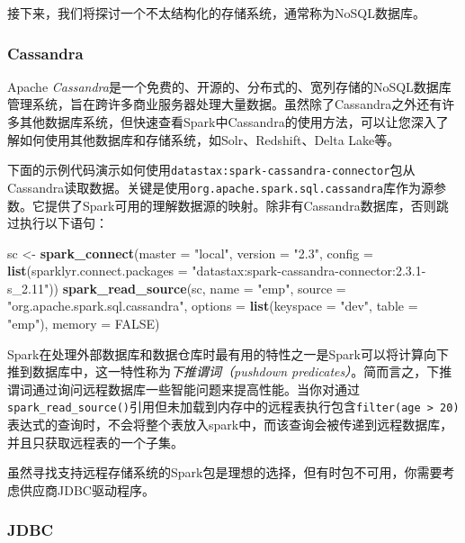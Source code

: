 \documentclass[
]{article}
\newenvironment{Shaded}{\begin{snugshade}}{\end{snugshade}}
\newcommand{\DataTypeTok}[1]{\textcolor[rgb]{0.13,0.29,0.53}{#1}}
\newcommand{\KeywordTok}[1]{\textcolor[rgb]{0.13,0.29,0.53}{\textbf{#1}}}
\newcommand{\NormalTok}[1]{#1}
\newcommand{\OtherTok}[1]{\textcolor[rgb]{0.56,0.35,0.01}{#1}}
\newcommand{\StringTok}[1]{\textcolor[rgb]{0.31,0.60,0.02}{#1}}
\begin{document}
接下来，我们将探讨一个不太结构化的存储系统，通常称为NoSQL数据库。

\hypertarget{cassandra}{%
\subsubsection{Cassandra}\label{cassandra}}

Apache
\emph{Cassandra}是一个免费的、开源的、分布式的、宽列存储的NoSQL数据库管理系统，旨在跨许多商业服务器处理大量数据。虽然除了Cassandra之外还有许多其他数据库系统，但快速查看Spark中Cassandra的使用方法，可以让您深入了解如何使用其他数据库和存储系统，如Solr、Redshift、Delta
Lake等。

下面的示例代码演示如何使用\texttt{datastax:spark-cassandra-connector}包从Cassandra读取数据。关键是使用\texttt{org.apache.spark.sql.cassandra}库作为源参数。它提供了Spark可用的理解数据源的映射。除非有Cassandra数据库，否则跳过执行以下语句：

\begin{Shaded}
\begin{Highlighting}[]
\NormalTok{sc <-}\StringTok{ }\KeywordTok{spark_connect}\NormalTok{(}\DataTypeTok{master =} \StringTok{"local"}\NormalTok{, }\DataTypeTok{version =} \StringTok{"2.3"}\NormalTok{, }\DataTypeTok{config =} \KeywordTok{list}\NormalTok{(}\DataTypeTok{sparklyr.connect.packages =} \StringTok{"datastax:spark-cassandra-connector:2.3.1-s_2.11"}\NormalTok{))}
\KeywordTok{spark_read_source}\NormalTok{(sc, }\DataTypeTok{name =} \StringTok{"emp"}\NormalTok{, }\DataTypeTok{source =} \StringTok{"org.apache.spark.sql.cassandra"}\NormalTok{, }\DataTypeTok{options =} \KeywordTok{list}\NormalTok{(}\DataTypeTok{keyspace =} \StringTok{"dev"}\NormalTok{, }
    \DataTypeTok{table =} \StringTok{"emp"}\NormalTok{), }\DataTypeTok{memory =} \OtherTok{FALSE}\NormalTok{)}
\end{Highlighting}
\end{Shaded}

Spark在处理外部数据库和数据仓库时最有用的特性之一是Spark可以将计算向下推到数据库中，这一特性称为\emph{下推谓词（pushdown
predicates）}。简而言之，下推谓词通过询问远程数据库一些智能问题来提高性能。当你对通过\texttt{spark\_read\_source()}引用但未加载到内存中的远程表执行包含\texttt{filter(age\ \textgreater{}\ 20)}表达式的查询时，不会将整个表放入spark中，而该查询会被传递到远程数据库，并且只获取远程表的一个子集。

虽然寻找支持远程存储系统的Spark包是理想的选择，但有时包不可用，你需要考虑供应商JDBC驱动程序。

\hypertarget{jdbc}{%
\subsubsection{JDBC}\label{jdbc}}
\end{document}
